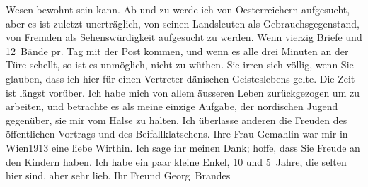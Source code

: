 \begin{ledgroupsized}[t]{13cm}
                    Wesen bewohnt sein kann.\pend
           \pstart
           Ab und zu werde ich von Oesterreichern
                    aufgesucht, aber es ist zuletzt unerträglich, von seinen Landsleuten als
                    Gebrauchsgegenstand, {\pb}von
                    Fremden als Sehenswürdigkeit aufgesucht zu werden. Wenn vierzig Briefe und
                    12 Bände pr. Tag  mit der Post \introOben{}kommen,\introOben{} und wenn es alle drei Minuten an der Türe
                    schellt, so ist es unmöglich, nicht zu wüthen.\pend
           \pstart
           Sie irren sich völlig, wenn Sie glauben, dass ich hier für einen Vertreter dänischen Geisteslebens gelte. Die Zeit ist
                    längst vorüber. Ich habe mich von allem äusseren Leben zurückgezogen um zu
                    arbeiten, und betrachte es als meine einzige Aufgabe, der nordischen Jugend gegenüber, sie mir vom Halse zu halten.
                    Ich überlasse anderen die Freuden des öffentlichen Vortrags und des
                    Beifallklatschens.\pend
           \pstart
           Ihre Frau Gemahlin war mir
                    in Wien1913 eine liebe Wirthin. Ich sage ihr meinen Dank; hoffe, dass Sie
                    Freude an den Kindern haben. Ich habe ein paar kleine Enkel, 10 und 5 Jahre, die selten hier sind, aber sehr lieb.\pend
           \pstart Ihr Freund \spacefill\mbox{Georg Brandes}\pend{}
         
         \endnumbering{}\end{ledgroupsized}  \newcommand{\dateiname}{L02303}\newcommand{\titel}{Georg Brandes an Arthur Schnitzler, 18. 9. 1918}\newcommand{\editorInnen}{Martin Anton Müller und Gerd-Hermann Susen}
      